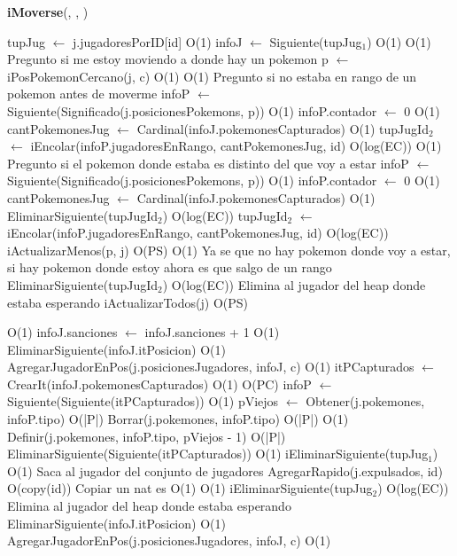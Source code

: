 \begin{algorithm}[H]{\textbf{iMoverse}(, , )}{}
	\begin{algorithmic}
	\State tupJug $\gets$ j.jugadoresPorID[id]	\Comment O(1)
	\State infoJ $\gets$ Siguiente(tupJug$_{1}$)	\Comment O(1)
		\Comment O(1) {Pregunto si me estoy moviendo a donde hay un pokemon}
		\State p $\gets$ iPosPokemonCercano(j, c)	\Comment O(1)
			\Comment O(1) {Pregunto si no estaba en rango de un pokemon antes de moverme}
			\State infoP $\gets$ Siguiente(Significado(j.posicionesPokemons, p))	\Comment O(1)
			\State infoP.contador $\gets$ 0 \Comment O(1)
			\State cantPokemonesJug $\gets$ Cardinal(infoJ.pokemonesCapturados)	\Comment O(1)
			\State tupJugId$_{2}$ $\gets$ iEncolar(infoP.jugadoresEnRango, cantPokemonesJug, id)	\Comment O(log(EC))
		\Else
				\Comment O(1) {Pregunto si el pokemon donde estaba es distinto del que voy a estar}
				\State infoP $\gets$ Siguiente(Significado(j.posicionesPokemons, p))	\Comment O(1)
			\State infoP.contador $\gets$ 0 \Comment O(1)
			\State cantPokemonesJug $\gets$ Cardinal(infoJ.pokemonesCapturados)	\Comment O(1)
			\State EliminarSiguiente(tupJugId$_{2}$)	\Comment O(log(EC))
			\State tupJugId$_{2}$ $\gets$ iEncolar(infoP.jugadoresEnRango, cantPokemonesJug, id)	\Comment O(log(EC))
			\EndIf
		\EndIf
		\State iActualizarMenos(p, j)	\Comment O(PS)
	\Else
			\Comment O(1) {Ya se que no hay pokemon donde voy a estar, si hay pokemon donde estoy ahora es que salgo de un rango}
			\State EliminarSiguiente(tupJugId$_{2}$)	\Comment O(log(EC)) {Elimina al jugador del heap donde estaba esperando}
		\EndIf
		\State iActualizarTodos(j)	\Comment O(PS)

	\EndIf
			\Comment O(1)
			\State infoJ.sanciones $\gets$ infoJ.sanciones + 1	\Comment O(1)
			\State EliminarSiguiente(infoJ.itPosicion) \Comment O(1)
			\State AgregarJugadorEnPos(j.posicionesJugadores, infoJ, c) \Comment O(1)
		\Else
			\State itPCapturados $\gets$ CrearIt(infoJ.pokemonesCapturados)	\Comment O(1)
				\Comment O(PC)
				\State infoP $\gets$ Siguiente(Siguiente(itPCapturados))	\Comment O(1)
				\State pViejos $\gets$ Obtener(j.pokemones, infoP.tipo)	\Comment O(|P|)
				\State Borrar(j.pokemones, infoP.tipo)	\Comment O(|P|)
					\Comment O(1)
					\State Definir(j.pokemones, infoP.tipo, pViejos - 1)	\Comment O(|P|)
				\EndIf
				\State EliminarSiguiente(Siguiente(itPCapturados))	\Comment O(1)		
			\EndWhile
			\State iEliminarSiguiente(tupJug$_{1}$)	\Comment O(1) {Saca al jugador del conjunto de jugadores}
			\State AgregarRapido(j.expulsados, id)	\Comment O(copy(id)) {Copiar un nat es O(1)}
				\Comment O(1)
				\State iEliminarSiguiente(tupJug$_{2}$)	\Comment O(log(EC)) {Elimina al jugador del heap donde estaba esperando}
			\EndIf
		\EndIf
	\Else
		\State EliminarSiguiente(infoJ.itPosicion) \Comment O(1)
		\State AgregarJugadorEnPos(j.posicionesJugadores, infoJ, c) \Comment O(1)
	\EndIf


\end{algorithmic}
\end{algorithm}
